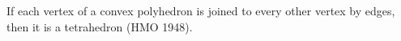 If each vertex of a convex polyhedron is joined to every other vertex by edges, then it is a tetrahedron (HMO 1948).
